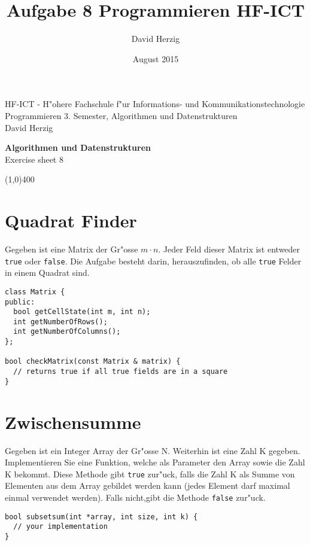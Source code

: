 \documentclass[a4paper,10pt]{article}
\title{Aufgabe 8 Programmieren HF-ICT}
\author{David Herzig}
\date{August 2015}
\begin{document}
HF-ICT - H"ohere Fachschule f"ur Informations- und Kommunikationstechnologie\\
Programmieren 3. Semester, Algorithmen und Datenstrukturen\\
David Herzig

\vspace{2mm}

\begin{center}
{\Large \bf Algorithmen und Datenstrukturen}\\
Exercise sheet 8
\end{center}

\vspace{2mm}

\line(1,0){400}

\vspace{5mm}

\section{Quadrat Finder}
Gegeben ist eine Matrix der Gr"osse $m \cdot n$. Jeder Feld dieser Matrix ist
entweder \verb|true| oder \verb|false|. Die Aufgabe besteht darin, herauszufinden,
ob alle \verb|true| Felder in einem Quadrat sind.

\vspace{3mm}

\begin{lstlisting}
class Matrix {
public:
  bool getCellState(int m, int n);
  int getNumberOfRows();
  int getNumberOfColumns();
};

bool checkMatrix(const Matrix & matrix) {
  // returns true if all true fields are in a square
}
\end{lstlisting}

\section{Zwischensumme}
Gegeben ist ein Integer Array der Gr"osse N. Weiterhin ist eine Zahl K gegeben.
Implementieren Sie eine Funktion, welche als Parameter den Array sowie die Zahl K
bekommt. Diese Methode gibt \verb|true| zur"uck, falls die Zahl K als Summe
von Elementen aus dem Array gebildet werden kann (jedes Element darf maximal
einmal verwendet werden). Falls nicht,gibt die Methode \verb|false|
zur"uck.

\vspace{3mm}

\begin{lstlisting}
bool subsetsum(int *array, int size, int k) {
  // your implementation
}
\end{lstlisting}
\end{document}
